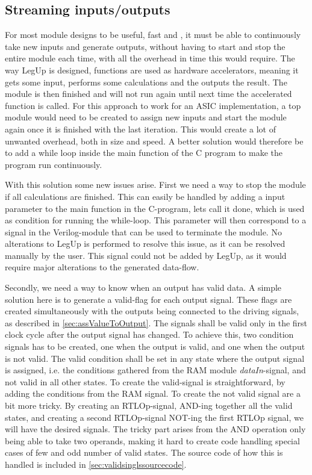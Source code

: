 \subsection{Streaming inputs/outputs}
For most module designs to be useful, fast and , it must be able to continuously take new inputs and generate outputs, without having to start and stop the entire module each time, with all the overhead in time this would require. The way LegUp is designed, functions are used as hardware accelerators, meaning it gets some input, performs some calculations and the outputs the result. The module is then finished and will not run again until next time the accelerated function is called. For this approach to work for an ASIC implementation, a top module would need to be created to assign new inputs and start the module again once it is finished with the last iteration. This would create a lot of unwanted overhead, both in size and speed. A better solution would therefore be to add a while loop inside the main function of the C program to make the program run continuously.

With this solution some new issues arise. 
First we need a way to stop the module if all calculations are finished. This can easily be handled by adding a input parameter to the main function in the C-program, lets call it done, which is used as condition for running the while-loop. This parameter will then correspond to a signal in the Verilog-module that can be used to terminate the module. No alterations to LegUp is performed to resolve this issue, as it can be resolved manually by the user. This signal could not be added by LegUp, as it would require major alterations to the generated data-flow.

Secondly, we need a way to know when an output has valid data. A simple solution here is to generate a valid-flag for each output signal. These flags are created simultaneously with the outputs being connected to the driving signals, as described in \ref{sec:assValueToOutput}. The signals shall be valid only in the first clock cycle after the output signal has changed. To achieve this, two condition signals has to be created, one when the output is valid, and one when the output is not valid. The valid condition shall be set in any state where the output signal is assigned, i.e. the conditions gathered from the RAM module \textit{dataIn}-signal, and not valid in all other states. To create the valid-signal is straightforward, by adding the conditions from the RAM signal. To create the not valid signal are a bit more tricky. By creating an RTLOp-signal, AND-ing together all the valid states, and creating a second RTLOp-signal NOT-ing the first RTLOp signal, we will have the desired signals. The tricky part arises from the AND operation only being able to take two operands, making it hard to create code handling special cases of few and odd number of valid states. The source code of how this is handled is included in \cref{sec:validsinglssourcecode}.

